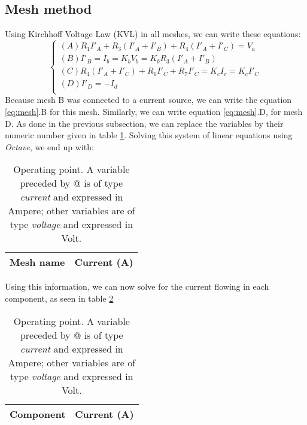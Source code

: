 \subsection{Mesh method}
Using Kirchhoff Voltage Law (KVL) in all meshes, we can write these equations:
\begin{equation}\label{eq:mesh}
\begin{cases}
  (A) R_1I'_A + R_3(I'_A + I'_B) + R_4(I'_A + I'_C) = V_a \\
  (B) I'_B = I_b = K_bV_b = K_bR_3(I'_A + I'_B) \\
  (C) R_4(I'_A+I'_C) + R_6I'_C + R_7I'_C = K_cI_c = K_cI'_C \\
  (D) I'_D = -I_d \\
\end{cases}
\end{equation}
Because mesh B was connected to a current source, we can write the equation \ref{eq:mesh}.B for this mesh. Similarly, we can write equation \ref{eq:mesh}.D, for mesh D. As done in the previous subsection, we can replace the variables by their numeric number given in table \ref{tab:mesh}. Solving this system of linear equations using \textit{Octave}, we end up with:
\begin{table}[H]
  \centering
  \begin{tabular}{|l|r|}
    \hline
        {\bf Mesh name} & {\bf Current (A)} \\ \hline
        
  \end{tabular}
  \caption{Operating point. A variable preceded by @ is of type {\em current}
   and expressed in Ampere; other variables are of type {\it voltage} and expressed in
    Volt.}
  \label{tab:mesh}
\end{table}
Using this information, we can now solve for the current flowing in each component, as seen in table \ref{tab:comp}
\begin{table}[H]
  \centering
  \begin{tabular}{|l|r|}
    \hline
        {\bf Component} & {\bf Current (A)} \\ \hline
        
  \end{tabular}
  \caption{Operating point. A variable preceded by @ is of type {\em current}
   and expressed in Ampere; other variables are of type {\it voltage} and expressed in
    Volt.}
  \label{tab:comp}
\end{table}
\par



